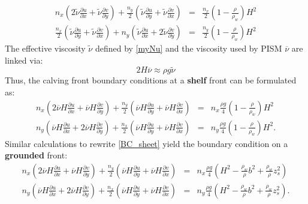 \documentclass[a4paper,10pt]{article}
\begin{document}
\begin{eqnarray*}
n_x\left(2\tilde{\nu}\frac{\partial u}{\partial x}+\tilde{\nu}\frac{\partial v}{\partial y}  \right) + \frac{n_y}{2} \left(\tilde{\nu}\frac{\partial u}{\partial y} + \tilde{\nu}\frac{\partial v}{\partial x} \right) & =  & \frac{n_x}{2}\left(1-\frac{\rho}{\rho_w}\right)H^2\\  
\frac{n_x}{2} \left(\tilde{\nu}\frac{\partial u}{\partial y} + \tilde{\nu}\frac{\partial v}{\partial x} \right) + n_y\left(\tilde{\nu}\frac{\partial u}{\partial x}+2\tilde{\nu}\frac{\partial v}{\partial y}  \right) & = & \frac{n_y}{2}\left(1-\frac{\rho}{\rho_w}\right)H^2 
\end{eqnarray*}
The effective viscosity $\tilde{\nu}$ defined by \eqref{myNu} and the viscosity used by PISM $\overline{\nu}$ are linked via:
\begin{equation*}%
2H\overline\nu\approx\rho g\tilde{\nu}
\label{nuLink}
\end{equation*}
Thus, the calving front boundary conditions at a \textbf{shelf} front can be formulated as:
\begin{eqnarray}%
n_x\left(2\overline{\nu}H\frac{\partial u}{\partial x}+\overline{\nu}H\frac{\partial v}{\partial y}  \right) + \frac{n_y}{2} \left(\overline{\nu}H\frac{\partial u}{\partial y} + \overline{\nu}H\frac{\partial v}{\partial x} \right) & =  & n_x\frac{\rho g}{4}\left(1-\frac{\rho}{\rho_w}\right)H^2 \label{calv_BC1}\\  
 n_y\left(\overline{\nu}H\frac{\partial u}{\partial x}+2\overline{\nu}H\frac{\partial v}{\partial y}  \right) + \frac{n_x}{2} \left(\overline{\nu}H\frac{\partial u}{\partial y} + \overline{\nu}H\frac{\partial v}{\partial x} \right) & = & n_y\frac{\rho g}{4}\left(1-\frac{\rho}{\rho_w}\right)H^2 . \label{calv_BC2}
\end{eqnarray}
Similar calculations to rewrite \eqref{BC_sheet} yield the boundary condition on a \textbf{grounded} front:
\begin{eqnarray}%
n_x\left(2\overline{\nu}H\frac{\partial u}{\partial x}+\overline{\nu}H\frac{\partial v}{\partial y}  \right) + \frac{n_y}{2} \left(\overline{\nu}H\frac{\partial u}{\partial y} + \overline{\nu}H\frac{\partial v}{\partial x} \right) & =  & n_x\frac{\rho g}{4}\left(H^2-\frac{\rho_w}{\rho}b^2+\frac{\rho_w}{\rho}z_s^2  \right) \label{sheet_BC1}\\  
 n_y\left(\overline{\nu}H\frac{\partial u}{\partial x}+2\overline{\nu}H\frac{\partial v}{\partial y}  \right) + \frac{n_x}{2} \left(\overline{\nu}H\frac{\partial u}{\partial y} + \overline{\nu}H\frac{\partial v}{\partial x} \right) & = & n_y\frac{\rho g}{4}\left(H^2-\frac{\rho_w}{\rho}b^2+\frac{\rho_w}{\rho}z_s^2 \right). \label{sheet_BC2}
\end{eqnarray}
\end{document}
